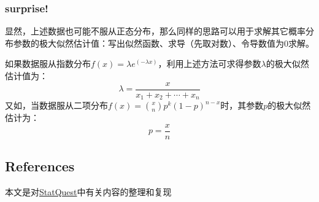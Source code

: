 \documentclass[
]{article}
\begin{document}
\subsubsection{surprise!}\label{surprise-1}

显然，上述数据也可能不服从正态分布，那么同样的思路可以用于求解其它概率分布参数的极大似然估计值：写出似然函数、求导（先取对数）、令导数值为0求解。

如果数据服从指数分布\(f(x)=\lambda e^{(-\lambda x)}\)，利用上述方法可求得参数\(\lambda\)的极大似然估计值为：
\[\lambda=\frac{x}{x_1+x_2+\cdots+x_n}\]
又如，当数据服从二项分布\(f(x)=\binom{x}{n}p^k(1-p)^{n-x}\)时，其参数\(p\)的极大似然估计为：
\[p=\frac{x}{n}\]

\subsection{References}\label{references}

本文是对\href{https://www.youtube.com/watch?v=XepXtl9YKwc}{StatQuest}中有关内容的整理和复现
\end{document}
